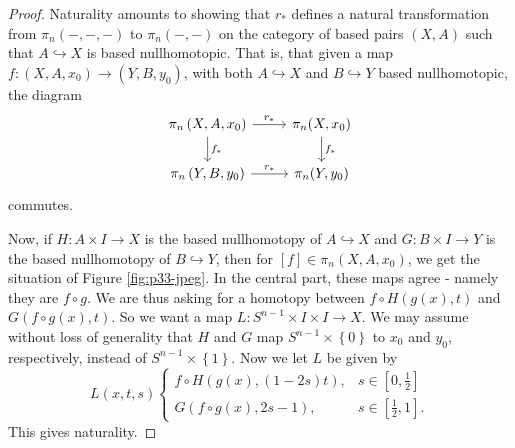 \begin{proof}
        Naturality amounts to showing that 
        $r_*$ defines a natural transformation from
        $\pi_n \left( - , -, - \right) $ to
        $\pi_n (-,-)$ on the
        category of based pairs $\left( X,A \right) $ 
        such that $A \hookrightarrow X$ is
        based nullhomotopic. That is, that given
        a map  $f \colon \left( X, A, x_0 \right) 
        \to \left( Y,B,y_0 \right) $, with
        both $A \hookrightarrow X$ and
        $B \hookrightarrow Y$ based nullhomotopic, the diagram
        \begin{equation*}
        \begin{tikzcd}
            \pi_n \left( X,A,x_0 \right) \ar[r, "r_*"] \ar[d, "
            f_*"] &
            \pi_n (X,x_0) \ar[d, "f_*"] \\
            \pi_n \left( Y,B,y_0 \right) \ar[r, "r_*"] & 
            \pi_n (Y,y_0)
        \end{tikzcd}
        \end{equation*}
        commutes.

        Now, if $H \colon A \times I \to X$ is
        the based nullhomotopy
        of $A \hookrightarrow X$ and
        $G \colon B \times I \to Y$ is the based
        nullhomotopy of 
        $B \hookrightarrow Y$, then
        for $\left[ f \right] \in 
        \pi_n \left( X,A,x_0 \right) $, we get the
        situation of
        Figure \ref{fig:p33-jpeg}.
        In the central part, these maps agree - namely they
        are $f \circ g$. We are thus asking for
        a homotopy
        between
        $f \circ H \left( g(x),t \right) $ and
        $G\left( f \circ g(x), t \right) $. So
         we want a map
         $L \colon S^{n-1} \times I \times I \to X$. 
         We may assume without loss of generality
         that $H$ and $G$ map
         $S^{n-1} \times \left\{ 0 \right\} $ to
         $x_0$ and $y_0$, respectively, instead
         of $S^{n-1} \times \left\{ 1 \right\} $.
         Now we let $L$ be
         given by
         \[
         L \left( x, t, s \right) 
         \begin{cases}
             f \circ H\left( g(x), (1-2s) t \right) ,& 
             s \in \left[ 0,\frac{1}{2} \right] \\
             G \left( f \circ g(x), 2s-1 \right),& s 
             \in \left[ \frac{1}{2},1 \right].
         \end{cases}
         \] 
         This gives naturality.


\end{proof}
